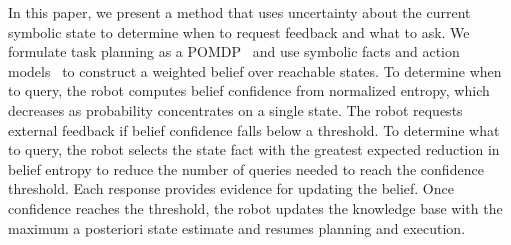 In this paper, we present a method that uses uncertainty about the current symbolic state to determine when to request feedback and what to ask. We formulate task planning as a POMDP~\citep{kaelbling1998planning} and use symbolic facts and action models~\citep{davis1993knowledge,fikes1971strips} to construct a weighted belief over reachable states. To determine when to query, the robot computes belief confidence from normalized entropy, which decreases as probability concentrates on a single state. The robot requests external feedback if belief confidence falls below a threshold. To determine what to query, the robot selects the state fact with the greatest expected reduction in belief entropy to reduce the number of queries needed to reach the confidence threshold. Each response provides evidence for updating the belief. Once confidence reaches the threshold, the robot updates the knowledge base with the maximum a posteriori state estimate and resumes planning and execution.


